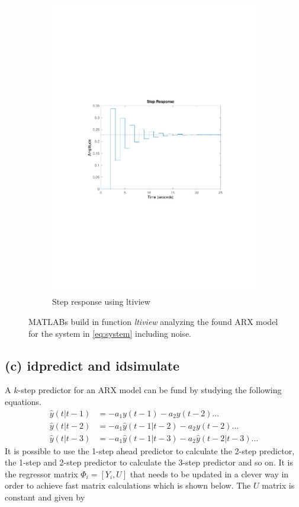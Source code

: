 \documentclass[]{article}
\begin{document}
\begin{figure}[ht]
\begin{subfigure}{.49\textwidth}
	\includegraphics[trim= 10cm 8cm 10cm 8cm, scale=0.4]{figures/1b-step.pdf}
	\caption{Step response using ltiview}
	\label{fig:1b-step}
\end{subfigure}
\caption{MATLABs build in function \emph{ltiview} analyzing the found ARX model for the system in \eqref{eq:system} including noise.}
\label{fig:1b-ltiview}
\end{figure}

\subsection{(c) idpredict and idsimulate}
A $k$-step predictor for an ARX model can be fund by studying the following equations.
\begin{align}
	\label{eq:K-step predictor}
	\hat{y}(t|t-1) &= -a_1y(t-1) -a_2y(t-2) \ldots \\
	\hat{y}(t|t-2) &= -a_1\hat{y}(t-1|t-2) -a_2y(t-2) \ldots \\
	\hat{y}(t|t-3) &= -a_1\hat{y}(t-1|t-3) -a_2\hat{y}(t-2|t-3) \ldots 
\end{align}
It is possible to use the 1-step ahead predictor to calculate the 2-step predictor, the 1-step and 2-step predictor to calculate the 3-step predictor and so on. It is the regressor matrix $\Phi_i = [Y_i, U]$ that needs to be updated in a clever way in order to achieve fast matrix calculations which is shown below. The $U$ matrix is constant and given by
\end{document}
